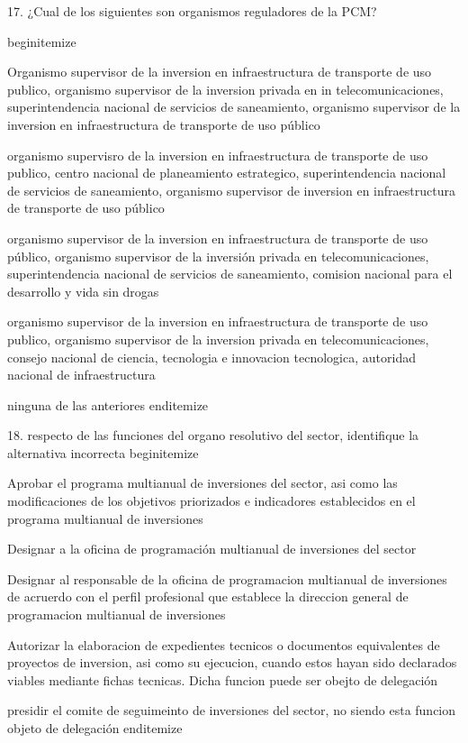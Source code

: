 17. ¿Cual de los siguientes son organismos reguladores de la PCM?

begin{itemize}
			\item Organismo supervisor de la inversion en infraestructura de transporte de uso publico, organismo supervisor de la inversion privada en in telecomunicaciones, superintendencia nacional de servicios de saneamiento, organismo supervisor de la inversion en infraestructura de transporte de uso público 
 			\item organismo supervisro de la inversion en infraestructura de transporte de uso publico, centro nacional de planeamiento estrategico, superintendencia nacional de servicios de saneamiento, organismo supervisor de inversion en infraestructura de transporte de uso público 
			\item organismo supervisor de la inversion en infraestructura de transporte de uso público,  organismo supervisor de la inversión privada en telecomunicaciones,  superintendencia nacional de servicios de saneamiento,  comision nacional para el desarrollo y vida sin drogas
			\item organismo supervisor de la inversion en infraestructura de transporte de uso publico, organismo supervisor de la inversion privada en telecomunicaciones, consejo nacional de ciencia, tecnologia e innovacion tecnologica, autoridad nacional de infraestructura 
			\item ninguna de las anteriores
end{itemize}

18. respecto de las funciones del organo resolutivo del sector, identifique la alternativa incorrecta
begin{itemize}
			\item Aprobar el programa multianual de inversiones del sector, asi como las modificaciones de los objetivos priorizados e indicadores establecidos en el programa multianual de inversiones 
 			\item Designar a la oficina de programación multianual de inversiones del sector
			\item Designar al responsable de la oficina de programacion multianual de inversiones de acruerdo con el perfil profesional que establece la direccion general de programacion multianual de inversiones
			\item Autorizar la elaboracion de expedientes tecnicos o documentos equivalentes de proyectos de inversion, asi como su ejecucion, cuando estos hayan sido declarados viables mediante fichas tecnicas. Dicha funcion puede ser obejto de delegación 
			\item presidir el comite de seguimeinto de inversiones del sector, no siendo esta funcion objeto de delegación 
end{itemize}

